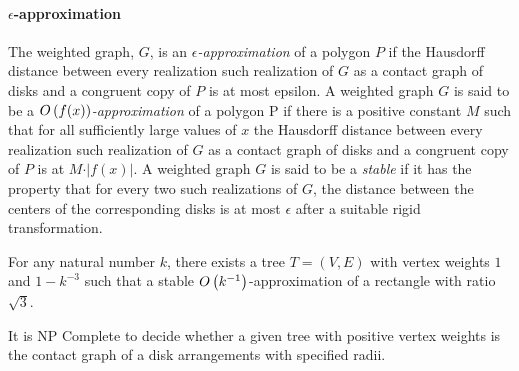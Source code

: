 \paragraph{$\epsilon$-approximation}
The weighted graph, $G$, is an \textit{$\epsilon$-approximation} of a polygon $P$ if the Hausdorff distance between every realization such realization of $G$ as a contact graph of disks and a congruent copy of $P$ is at most epsilon.  A weighted graph $G$ is said to be a \textit{$O\left( f(x) \right)$-approximation} of a polygon P if there is a positive constant $M$ such that for all sufficiently large values of $x$ the Hausdorff distance between every realization such realization of $G$ as a contact graph of disks and a congruent copy of $P$ is at $M \cdot \vert f(x)\vert$. A weighted graph $G$ is said to be a \textit{stable} if it has the property that for every two such realizations of $G$, the distance between the centers of the corresponding disks is at most $\epsilon$ after a suitable rigid transformation.  





\begin{lem}\label{lem:ContactGraphV3-1}
For any natural number $k$,  there exists a tree $T = (V,E)$ with vertex weights $1$ and $1 - k^{-3}$ such that a stable $O\left( k^{-1} \right)$-approximation of a rectangle with ratio $\sqrt{3}$.
\end{lem}
\begin{thm}
It is NP Complete to decide whether a given tree with positive vertex weights is the contact graph of a disk arrangements with specified radii.

\end{thm}


